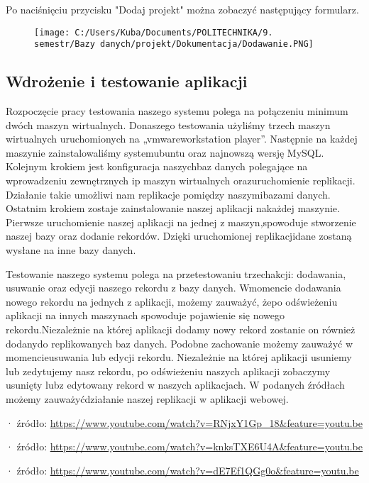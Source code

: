 \documentclass[]{article}
\begin{document}
Po naciśnięciu przycisku "Dodaj projekt" można zobaczyć następujący
formularz.

\begin{figure}
\centering
\texttt{[image: C:/Users/Kuba/Documents/POLITECHNIKA/9. semestr/Bazy danych/projekt/Dokumentacja/Dodawanie.PNG]}
\caption{}
\end{figure}

\hypertarget{header-n169}{%
\subsection{Wdrożenie i testowanie aplikacji}\label{header-n169}}

Rozpoczęcie pracy testowania naszego systemu polega na połączeniu
minimum dwóch maszyn wirtualnych. Donaszego testowania użyliśmy trzech
maszyn wirtualnych uruchomionych na „vmwareworkstation player''.
Następnie na każdej maszynie zainstalowaliśmy systemubuntu oraz
najnowszą wersję MySQL. Kolejnym krokiem jest konfiguracja naszychbaz
danych polegające na wprowadzeniu zewnętrznych ip maszyn wirtualnych
orazuruchomienie replikacji. Działanie takie umożliwi nam replikacje
pomiędzy naszymibazami danych. Ostatnim krokiem zostaje zainstalowanie
naszej aplikacji nakażdej maszynie. Pierwsze uruchomienie naszej
aplikacji na jednej z maszyn,spowoduje stworzenie naszej bazy oraz
dodanie rekordów. Dzięki uruchomionej replikacjidane zostaną wysłane na
inne bazy danych.

Testowanie naszego systemu polega na przetestowaniu trzechakcji:
dodawania, usuwanie oraz edycji naszego rekordu z bazy danych. Wmomencie
dodawania nowego rekordu na jednych z aplikacji, możemy zauważyć, żepo
odświeżeniu aplikacji na innych maszynach spowoduje pojawienie się
nowego rekordu.Niezależnie na której aplikacji dodamy nowy rekord
zostanie on również dodanydo replikowanych baz danych. Podobne
zachowanie możemy zauważyć w momencieusuwania lub edycji rekordu.
Niezależnie na której aplikacji usuniemy lub zedytujemy nasz rekordu, po
odświeżeniu naszych aplikacji zobaczymy usunięty lubz edytowany rekord w
naszych aplikacjach. W podanych źródłach możemy zauważyćdziałanie naszej
replikacji w aplikacji webowej.

· źródło:
\url{https://www.youtube.com/watch?v=RNjxY1Gp_18\&feature=youtu.be}

· źródło:
\url{https://www.youtube.com/watch?v=knksTXE6U4A\&feature=youtu.be}

· źródło:
\url{https://www.youtube.com/watch?v=dE7Ef1QGg0o\&feature=youtu.be}
\end{document}
